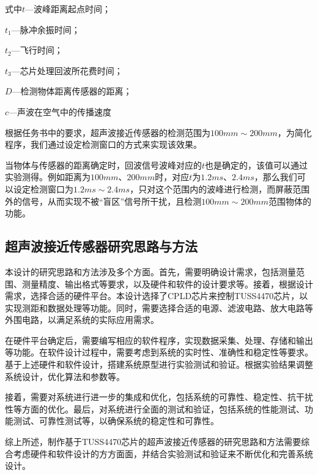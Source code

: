 式中\quad$t$---波峰距离起点时间；\par
    \quad$t_1$---脉冲余振时间；\par
    \quad$t_2$---飞行时间；\par    
    \quad$t_3$---芯片处理回波所花费时间；\par 
    \quad$D$---检测物体距离传感器的距离；\par  
    \quad$c$---声波在空气中的传播速度\par    
    根据任务书中的要求，超声波接近传感器的检测范围为$100mm\sim200mm$，为简化程序，我们通过设定检测窗口的方式来实现该效果。\par  
    当物体与传感器的距离确定时，回波信号波峰对应的$t$也是确定的，该值可以通过实验测得。例如距离为$100mm$、$200mm$时，对应$t$为$1.2ms$、$2.4ms$，那么我们可以设定检测窗口为$1.2ms\sim2.4ms$，只对这个范围内的波峰进行检测，而屏蔽范围外的信号，从而实现不被“盲区”信号所干扰，且检测$100mm\sim200mm$范围物体的功能。\par
    
    
    \subsection{超声波接近传感器研究思路与方法}
    本设计的研究思路和方法涉及多个方面。首先，需要明确设计需求，包括测量范围、测量精度、输出格式等要求，以及硬件和软件的设计要求等。接着，根据设计需求，选择合适的硬件平台。本设计选择了CPLD芯片来控制TUSS4470芯片，以实现测距和数据处理等功能。同时，需要选择合适的电源、滤波电路、放大电路等外围电路，以满足系统的实际应用需求。
    
    在硬件平台确定后，需要编写相应的软件程序，实现数据采集、处理、存储和输出等功能。在软件设计过程中，需要考虑到系统的实时性、准确性和稳定性等要求。基于上述硬件和软件设计，搭建系统原型进行实验测试和验证。根据实验结果调整系统设计，优化算法和参数等。
    
    接着，需要对系统进行进一步的集成和优化，包括系统的可靠性、稳定性、抗干扰性等方面的优化。最后，对系统进行全面的测试和验证，包括系统的性能测试、功能测试、可靠性测试等，以确保系统的稳定性和可靠性。
    
    综上所述，制作基于TUSS4470芯片的超声波接近传感器的研究思路和方法需要综合考虑硬件和软件设计的方方面面，并结合实验测试和验证来不断优化和完善系统设计。